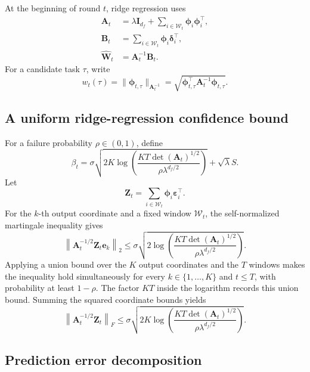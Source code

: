 At the beginning of round \(t\), ridge regression uses
\begin{equation}
\begin{aligned}
    \mathbf{A}_{t}&=\lambda\mathbf{I}_{d_f}+\sum_{i\in\mathcal{W}_t}\boldsymbol{\phi}_{i}\boldsymbol{\phi}_{i}^{\top}, \\
    \mathbf{B}_{t}&=\sum_{i\in\mathcal{W}_t}\boldsymbol{\phi}_{i}\boldsymbol{\delta}_{i}^{\top}, \\
    \widehat{\mathbf{W}}_{t}&=\mathbf{A}_{t}^{-1}\mathbf{B}_{t}.
\end{aligned}
\label{eq:app-ridge}
\end{equation}
For a candidate task \(\tau\), write
\[
    w_t(\tau)=\lVert\boldsymbol{\phi}_{t,\tau}\rVert_{\mathbf{A}_t^{-1}}
    =\sqrt{\boldsymbol{\phi}_{t,\tau}^{\top}\mathbf{A}_t^{-1}\boldsymbol{\phi}_{t,\tau}}.
\]

\subsection{A uniform ridge-regression confidence bound}

For a failure probability \(\rho\in(0,1)\), define
\[
    \beta_t=\sigma\sqrt{2K\log\!\left(
    \frac{KT\det(\mathbf{A}_t)^{1/2}}{\rho\lambda^{d_f/2}}
    \right)}+\sqrt{\lambda}S.
\]
Let
\[
    \mathbf{Z}_t=\sum_{i\in\mathcal{W}_t}\boldsymbol{\phi}_{i}\boldsymbol{\varepsilon}_{i}^{\top}.
\]
For the \(k\)-th output coordinate and a fixed window \(\mathcal{W}_t\), the self-normalized martingale inequality gives
\[
    \left\lVert\mathbf{A}_t^{-1/2}\mathbf{Z}_t\mathbf{e}_k\right\rVert_2
    \leq\sigma\sqrt{2\log\!\left(
    \frac{KT\det(\mathbf{A}_t)^{1/2}}{\rho\lambda^{d_f/2}}
    \right)}.
\]
Applying a union bound over the \(K\) output coordinates and the \(T\) windows makes the inequality hold simultaneously for every \(k\in\{1,\ldots,K\}\) and \(t\leq T\), with probability at least \(1-\rho\). The factor \(KT\) inside the logarithm records this union bound. Summing the squared coordinate bounds yields
\begin{equation}
    \left\lVert\mathbf{A}_t^{-1/2}\mathbf{Z}_t\right\rVert_F
    \leq\sigma\sqrt{2K\log\!\left(
    \frac{KT\det(\mathbf{A}_t)^{1/2}}{\rho\lambda^{d_f/2}}
    \right)}.
    \label{eq:app-frobenius-bound}
\end{equation}

\subsection{Prediction error decomposition}

